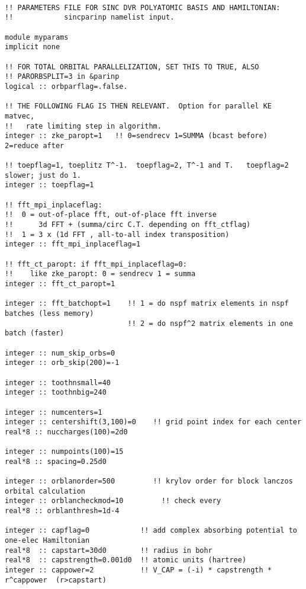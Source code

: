 \begin{verbatim}

!! PARAMETERS FILE FOR SINC DVR POLYATOMIC BASIS AND HAMILTONIAN:
!!            sincparinp namelist input.

module myparams
implicit none

!! FOR TOTAL ORBITAL PARALLELIZATION, SET THIS TO TRUE, ALSO
!! PARORBSPLIT=3 in &parinp
logical :: orbparflag=.false.

!! THE FOLLOWING FLAG IS THEN RELEVANT.  Option for parallel KE matvec,
!!   rate limiting step in algorithm.
integer :: zke_paropt=1   !! 0=sendrecv 1=SUMMA (bcast before) 2=reduce after

!! toepflag=1, toeplitz T^-1.  toepflag=2, T^-1 and T.   toepflag=2 slower; just do 1.
integer :: toepflag=1

!! fft_mpi_inplaceflag:
!!  0 = out-of-place fft, out-of-place fft inverse
!!      3d FFT + (summa/circ C.T. depending on fft_ctflag)
!!  1 = 3 x (1d FFT , all-to-all index transposition)
integer :: fft_mpi_inplaceflag=1    

!! fft_ct_paropt: if fft_mpi_inplaceflag=0:
!!    like zke_paropt: 0 = sendrecv 1 = summa
integer :: fft_ct_paropt=1

integer :: fft_batchopt=1    !! 1 = do nspf matrix elements in nspf batches (less memory)
                             !! 2 = do nspf^2 matrix elements in one batch (faster)

integer :: num_skip_orbs=0
integer :: orb_skip(200)=-1

integer :: toothnsmall=40
integer :: toothnbig=240

integer :: numcenters=1
integer :: centershift(3,100)=0    !! grid point index for each center
real*8 :: nuccharges(100)=2d0

integer :: numpoints(100)=15
real*8 :: spacing=0.25d0

integer :: orblanorder=500         !! krylov order for block lanczos orbital calculation
integer :: orblancheckmod=10         !! check every
real*8 :: orblanthresh=1d-4

integer :: capflag=0            !! add complex absorbing potential to one-elec Hamiltonian
real*8  :: capstart=30d0        !! radius in bohr
real*8  :: capstrength=0.001d0  !! atomic units (hartree)
integer :: cappower=2           !! V_CAP = (-i) * capstrength * r^cappower  (r>capstart)

\end{verbatim}
